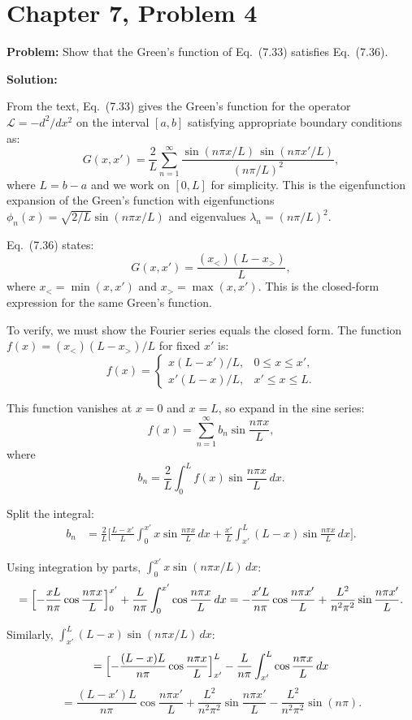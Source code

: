 \documentclass[12pt]{article}
\begin{document}
\section*{Chapter 7, Problem 4}

\textbf{Problem:} Show that the Green's function of Eq.\ (7.33) satisfies Eq.\ (7.36).

\bigskip
\textbf{Solution:}

From the text, Eq.\ (7.33) gives the Green's function for the operator $\mathcal{L} = -d^2/dx^2$ on the interval $[a,b]$ satisfying appropriate boundary conditions as:
\[
G(x,x') = \frac{2}{L}\sum_{n=1}^{\infty} \frac{\sin(n\pi x/L)\,\sin(n\pi x'/L)}{(n\pi/L)^2},
\]
where $L = b - a$ and we work on $[0,L]$ for simplicity. This is the eigenfunction expansion of the Green's function with eigenfunctions $\phi_n(x) = \sqrt{2/L}\sin(n\pi x/L)$ and eigenvalues $\lambda_n = (n\pi/L)^2$.

Eq.\ (7.36) states:
\[
G(x,x') = \frac{(x_< )(L - x_>)}{L},
\]
where $x_< = \min(x,x')$ and $x_> = \max(x,x')$. This is the closed-form expression for the same Green's function.

To verify, we must show the Fourier series equals the closed form. The function $f(x) = (x_<)(L-x_>)/L$ for fixed $x'$ is:
\[
f(x) = \begin{cases} x(L-x')/L, & 0 \le x \le x', \\ x'(L-x)/L, & x' \le x \le L. \end{cases}
\]

This function vanishes at $x=0$ and $x=L$, so expand in the sine series:
\[
f(x) = \sum_{n=1}^{\infty} b_n \sin\frac{n\pi x}{L},
\]
where
\[
b_n = \frac{2}{L}\int_0^L f(x)\sin\frac{n\pi x}{L}\,dx.
\]

Split the integral:
\begin{align}
b_n &= \frac{2}{L}\Biggl[\frac{L-x'}{L}\int_0^{x'} x\sin\frac{n\pi x}{L}\,dx + \frac{x'}{L}\int_{x'}^L (L-x)\sin\frac{n\pi x}{L}\,dx\Biggr].
\end{align}

Using integration by parts, $\int_0^{x'} x\sin(n\pi x/L)\,dx$:
\[
= \Bigl[-\frac{xL}{n\pi}\cos\frac{n\pi x}{L}\Bigr]_0^{x'} + \frac{L}{n\pi}\int_0^{x'}\cos\frac{n\pi x}{L}\,dx = -\frac{x'L}{n\pi}\cos\frac{n\pi x'}{L} + \frac{L^2}{n^2\pi^2}\sin\frac{n\pi x'}{L}.
\]

Similarly, $\int_{x'}^L (L-x)\sin(n\pi x/L)\,dx$:
\[
= \Bigl[-\frac{(L-x)L}{n\pi}\cos\frac{n\pi x}{L}\Bigr]_{x'}^L - \frac{L}{n\pi}\int_{x'}^L \cos\frac{n\pi x}{L}\,dx
\]
\[
= \frac{(L-x')L}{n\pi}\cos\frac{n\pi x'}{L} + \frac{L^2}{n^2\pi^2}\sin\frac{n\pi x'}{L} - \frac{L^2}{n^2\pi^2}\sin(n\pi).
\]
\end{document}
